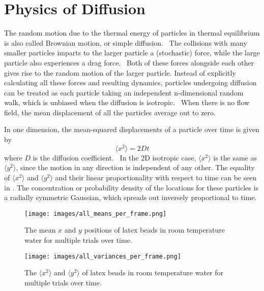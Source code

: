 \section{Physics of Diffusion}
The random motion due to the thermal energy of particles in thermal equilibrium is also called Brownian motion, or simple diffusion.~\cite{Berg1993} The collisions with many smaller particles imparts to the larger particle a (stochastic) force, while the large particle also experiences a drag force.~\cite{deGrooth1999} Both of these forces alongside each other gives rise to the random motion of the larger particle. Instead of explicitly calculating all these forces and resulting dynamics, particles undergoing diffusion can be treated as each particle taking an independent n-dimensional random walk, which is unbiased when the diffusion is isotropic.~\cite{Berg1993} When there is no flow field, the mean displacement of all the particles average out to zero.~\cite{Berg1993}

In one dimension, the mean-squared displacements of a particle over time is given by \begin{equation}
    \langle x^2\rangle = 2Dt
\end{equation}
\noindent
where $D$ is the diffusion coefficient.~\cite{Berg1993} In the 2D isotropic case, $\langle x^2\rangle$ is the same as $\langle y^2\rangle$, since the motion in any direction is independent of any other. The equality of $\langle x^2\rangle$ and $\langle y^2\rangle$ and their linear proportionality with respect to time can be seen in . The concentration or probability density of the locations for these particles is a radially symmetric Gaussian, which spreads out inversely proportional to time.~\cite{CaltechNotes} 

\begin{figure}[htbp]
    \centering
    \texttt{[image: images/all\_means\_per\_frame.png]}
    \caption{The mean $x$ and $y$ positions of latex beads in room temperature water for multiple trials over time.
    } 
    \label{fig:all_means}
\end{figure}

\begin{figure}[htbp]
    \centering
    \texttt{[image: images/all\_variances\_per\_frame.png]}
    \caption{The $\langle x^2\rangle$ and $\langle y^2\rangle$ of latex beads in room temperature water for multiple trials over time.
    }
    \label{fig:all_variances}
\end{figure}

